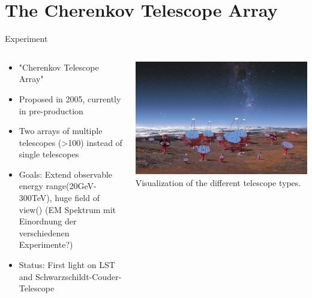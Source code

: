 \section{The Cherenkov Telescope Array}


\begin{frame}{Experiment}
    \begin{columns}[T] %
        \begin{column}{.45\textwidth}
            \vspace{10pt}
            \begin{itemize}
                \item "Cherenkov Telescope Array"
                \item Proposed in 2005, currently in pre-production
                \item Two arrays of multiple telescopes (>100) instead of single telescopes
                \item Goals: Extend observable energy range(20GeV-300TeV), huge field of view() (EM Spektrum mit Einordnung der verschiedenen Experimente?)
                \item Status: First light on LST and Schwarzschildt-Couder-Telescope
            \end{itemize}
        \end{column}%
        \hfill%
        \begin{column}{.53\textwidth}
            \includegraphics[width=\linewidth]{images/cta_telescopes.jpg}
            Visualization of the different telescope types.
            \cite{cta_telescopes}
        \end{column}%
    \end{columns}
    
\end{frame}


